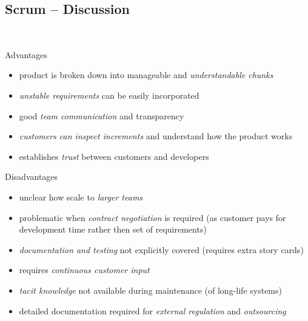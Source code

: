 \subsection{Scrum -- Discussion}
\begin{frame}{\insertsubsection\ \mytitlesource{\sommerville}}
	\begin{fancycolumns}
		\begin{note}{Advantages}
			\begin{itemize}
				\item product is broken down into manageable and \emph{understandable chunks}
				\item \emph{unstable requirements} can be easily incorporated
				\item good \emph{team communication} and transparency
				\item \emph{customers can inspect increments} and understand how the product works
				\item establishes \emph{trust} between customers and developers
			\end{itemize}
		\end{note}
		\nextcolumn
		\begin{note}{Disadvantages}
			\begin{itemize}
				\item unclear how scale to \emph{larger teams}
				\item problematic when \emph{contract negotiation} is required (as customer pays for development time rather then set of requirements)
				\item \emph{documentation and testing} not explicitly covered (requires extra story cards)
				\item requires \emph{continuous customer input}
				\item \emph{tacit knowledge} not available during maintenance (of long-life systems)
				\item detailed documentation required for \emph{external regulation} and \emph{outsourcing}
			\end{itemize}
		\end{note}
	\end{fancycolumns}
\end{frame}

